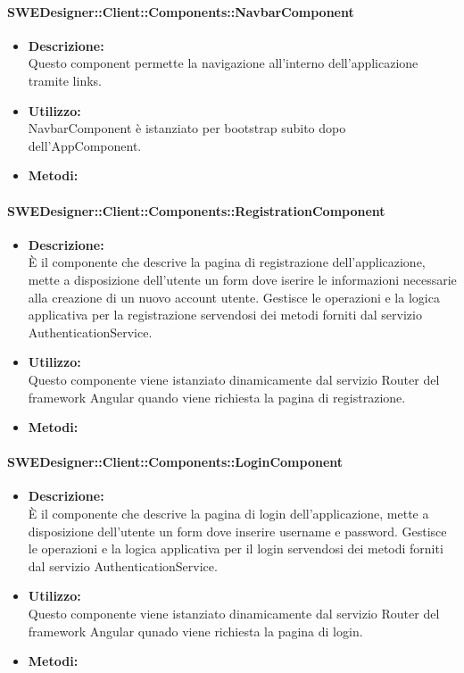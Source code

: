 			\paragraph{SWEDesigner::Client::Components::NavbarComponent}
				\begin{itemize}
          			\item \textbf{Descrizione:}\\
          			Questo component permette la navigazione all’interno dell’applicazione tramite links.
          			\item \textbf{Utilizzo:}\\
          			NavbarComponent è istanziato per bootstrap subito dopo dell’AppComponent.
          			\item \textbf{Metodi:}\\
          		\end{itemize}
			\paragraph{SWEDesigner::Client::Components::RegistrationComponent}
				\begin{itemize}
          			\item \textbf{Descrizione:}\\
          			È il componente che descrive la pagina di registrazione dell’applicazione, mette a disposizione dell’utente un form dove iserire le informazioni necessarie alla creazione di un nuovo account utente. Gestisce le operazioni e la logica applicativa per la registrazione servendosi dei metodi forniti dal servizio AuthenticationService.
          			\item \textbf{Utilizzo:}\\
          			Questo componente viene istanziato dinamicamente dal servizio Router del framework Angular quando viene richiesta la pagina di registrazione.
          			\item \textbf{Metodi:}\\
          		\end{itemize}
			\paragraph{SWEDesigner::Client::Components::LoginComponent}
				\begin{itemize}
          			\item \textbf{Descrizione:}\\
          			È il componente che descrive la pagina di login dell’applicazione, mette a disposizione dell’utente un form dove inserire username e password. Gestisce le operazioni e la logica applicativa per il login servendosi dei metodi forniti dal servizio AuthenticationService.
          			\item \textbf{Utilizzo:}\\
          			Questo componente viene istanziato dinamicamente dal servizio Router del framework Angular qunado viene richiesta la pagina di login.
          			\item \textbf{Metodi:}\\
          		\end{itemize}
